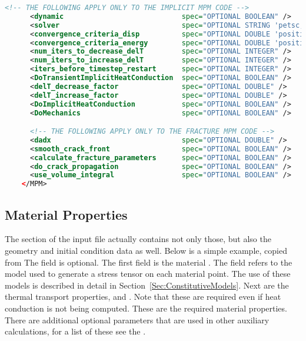 \begin{lstlisting}[language=XML]
     <!-- THE FOLLOWING APPLY ONLY TO THE IMPLICIT MPM CODE -->
      <dynamic                            spec="OPTIONAL BOOLEAN" />
      <solver                             spec="OPTIONAL STRING 'petsc, simple'" />
      <convergence_criteria_disp          spec="OPTIONAL DOUBLE 'positive'"/>
      <convergence_criteria_energy        spec="OPTIONAL DOUBLE 'positive'"/>
      <num_iters_to_decrease_delT         spec="OPTIONAL INTEGER" />
      <num_iters_to_increase_delT         spec="OPTIONAL INTEGER" />
      <iters_before_timestep_restart      spec="OPTIONAL INTEGER" />
      <DoTransientImplicitHeatConduction  spec="OPTIONAL BOOLEAN" />
      <delT_decrease_factor               spec="OPTIONAL DOUBLE" />
      <delT_increase_factor               spec="OPTIONAL DOUBLE" />
      <DoImplicitHeatConduction           spec="OPTIONAL BOOLEAN" />
      <DoMechanics                        spec="OPTIONAL BOOLEAN" />

      <!-- THE FOLLOWING APPLY ONLY TO THE FRACTURE MPM CODE -->
      <dadx                               spec="OPTIONAL DOUBLE" />
      <smooth_crack_front                 spec="OPTIONAL BOOLEAN" />
      <calculate_fracture_parameters      spec="OPTIONAL BOOLEAN" />
      <do_crack_propagation               spec="OPTIONAL BOOLEAN" />
      <use_volume_integral                spec="OPTIONAL BOOLEAN" />
    </MPM>
\end{lstlisting}



\subsection{Material Properties} \label{Sec:mat_props}

The  section of the input file
actually contains not only those, but also the geometry and initial
condition data as well.  Below is a simple example, copied from
  The  field
is optional.  The first field is the material .
The  field refers
to the model used to generate a stress tensor on each material point.
The use of these models is described in detail in
Section~\ref{Sec:ConstitutiveModels}.  Next are the thermal transport properties,
 and 
.  Note that these are required even if
heat conduction is not being computed.  These are the required material
properties.  There are additional optional parameters that are used in
other auxiliary calculations, for a list of these
see the .


